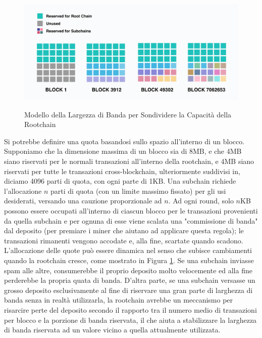 \begin{figure}[ht]
	\includegraphics[width=\textwidth]{Figura3.png}
	\label{fig:fig3}
	\caption{Modello della Largezza di Banda per Sondividere la Capacità della Rootchain}
\end{figure}

Si potrebbe definire una quota basandosi sullo spazio all'interno di un blocco. Supponiamo che la dimensione massima di un blocco sia di 8MB, e che 4MB siano riservati per le normali transazioni all'interno della rootchain, e 4MB siano riservati per tutte le transazioni cross-blockchain, ulteriormente suddivisi in, diciamo 4096 parti di quota, con ogni parte di 1KB. Una subchain richiede l'allocazione $n$ parti di quota (con un limite massimo fissato) per gli usi desiderati, versando una cauzione proporzionale ad $n$. Ad ogni round, solo $n$KB possono essere occupati all'interno di ciascun blocco per le transazioni provenienti da quella subchain e per ognuna di esse viene scalata una "commissione di banda" dal deposito (per premiare i miner che aiutano ad applicare questa regola); le transazioni rimanenti vengono accodate e, alla fine, scartate quando scadono. L'allocazione delle quote può essere dinamica nel senso che subisce cambiamenti quando la rootchain cresce, come mostrato in Figura \ref{fig:fig3}. Se una subchain inviasse spam alle altre, consumerebbe il proprio deposito molto velocemente ed alla fine perderebbe la propria quata di banda. D'altra parte, se una subchain versasse un grosso deposito esclusivamente al fine di riservare una gran parte di larghezza di banda senza in realtà utilizzarla, la rootchain avrebbe un meccanismo per risarcire perte del deposito secondo il rapporto tra il numero medio di transazioni per blocco e la porzione di banda riservata, il che aiuta a stabilizzare la larghezza di banda riservata ad un valore vicino a quella attualmente utilizzata.